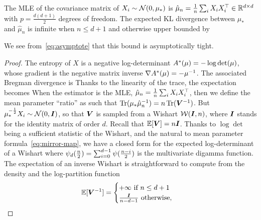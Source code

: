 \begin{subappendices}
\begin{theorem}
	The MLE of  the covariance matrix of $X_i\sim\cN(0,\mu_*)$ is $\hat \mu_n = \inv{n} \sum_i X_i X_i^\top \in\real^{d\times d}$ with $p = \frac{d(d+1)}{2} $ degrees of freedom. 
	The expected KL divergence between $\mu_*$ and $\hat\mu_n$ 
	is infinite when $n\leq d+1$ and otherwise upper bounded by
\end{theorem}
We see from~\eqref{eq:asymptote} that this bound is asymptotically tight.
\begin{proof}
The entropy of $X$ is a negative log-determinant $\conj(\mu) = -\log\det(\mu)$, whose gradient is the negative matrix inverse $\nabla\conj (\mu) = - \mu^{-1}$.
The associated Bregman divergence is
Thanks to the linearity of the trace, the expectation becomes
When the estimator is the MLE, $\hat \mu_n = \inv{n} \sum_i X_i X_i^\top$, 
then we define the mean parameter ``ratio'' as
such that $\Tr(\mu_* \hat \mu_n^{-1})  = n \Tr(\mV^{-1})$.
But $\mu_*^{-\half}X_i \sim \cN(0,\mI)$, so that $\mV$
is sampled from a Wishart  $\cW(\mI, n)$, where $\mI$ stands for the identity matrix of order $d$.
Recall that $\E[\mV] = n \mI$.
Thanks to $\log\det$ being a sufficient statistic of the Wishart, and the natural to mean parameter formula~\eqref{eq:mirror-map}, we have a closed form for the expected log-determinant of a Wishart 
where $\psi_d(\half[n]) = \sum_{i=0}^{d-1} \psi ( \half[n - i])$ is the multivariate digamma function.
The expectation of an inverse Wishart  is straightforward to compute from the density and the log-partition function
\begin{equation}
	\E[\mV^{-1}] = \begin{cases}
		+\infty \text{ if } n\leq d+1 \\
		 \frac{\mI}{n - d - 1} \text{ otherwise,} 
	\end{cases}
\end{equation}

\end{proof}
\end{subappendices}
